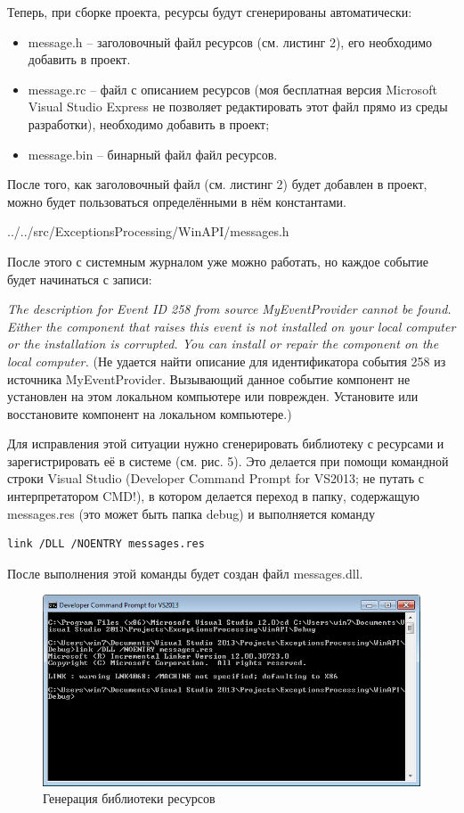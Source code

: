 \documentclass[a4paper, 12pt]{report}		%
\begin{document}
Теперь, при сборке проекта, ресурсы будут сгенерированы автоматически:
\begin{itemize}
\item message.h -- заголовочный файл ресурсов (см. листинг 2), его необходимо добавить в проект.
\item message.rc -- файл с описанием ресурсов (моя бесплатная версия Microsoft Visual Studio Express не позволяет редактировать этот файл прямо из среды разработки), необходимо добавить в проект;
\item message.bin -- бинарный файл файл ресурсов.
\end{itemize}

После того, как заголовочный файл (см. листинг 2) будет добавлен в проект, можно будет пользоваться определёнными в нём константами.


{../../src/ExceptionsProcessing/WinAPI/messages.h}

После этого с системным журналом уже можно работать, но каждое событие будет начинаться с записи:

\textit{The description for Event ID 258 from source MyEventProvider cannot be found. Either the component that raises this event is not installed on your local computer or the installation is corrupted. You can install or repair the component on the local computer.} (Не удается найти описание для идентификатора события 258 из источника MyEventProvider. Вызывающий данное событие компонент не установлен на этом локальном компьютере или поврежден. Установите или восстановите компонент на локальном компьютере.)

Для исправления этой ситуации нужно сгенерировать библиотеку с ресурсами и зарегистрировать её в системе (см. рис. 5). Это делается при помощи командной строки Visual Studio (Developer Command Prompt for VS2013; не путать с интерпретатором CMD!), в котором делается переход в папку, содержащую messages.res (это может быть папка debug) и выполняется команду
\begin{verbatim}
link /DLL /NOENTRY messages.res
\end{verbatim}

После выполнения этой команды будет создан файл messages.dll.

\begin{figure}[h!]
\centering
\includegraphics[scale=0.9]{res/res}
\caption{Генерация библиотеки ресурсов}
\end{figure}
\end{document}

